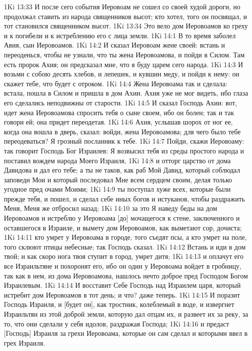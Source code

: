 1Ki 13:33  И после сего события Иеровоам не сошел со своей худой дороги, но продолжал ставить из народа священников высот; кто хотел, того он посвящал, и тот становился священником высот.
1Ki 13:34  Это вело дом Иеровоамов ко греху и к погибели и к истреблению его с лица земли.
1Ki 14:1  В то время заболел Авия, сын Иеровоамов.
1Ki 14:2  И сказал Иеровоам жене своей: встань и переоденься, чтобы не узнали, что ты жена Иеровоамова, и пойди в Силом. Там есть пророк Ахия; он предсказал мне, что я буду царем сего народа.
1Ki 14:3  И возьми с собою десять хлебов, и лепешек, и кувшин меду, и пойди к нему: он скажет тебе, что будет с отроком.
1Ki 14:4  Жена Иеровоама так и сделала: встала, пошла в Силом и пришла в дом Ахии. Ахия уже не мог видеть, ибо глаза его сделались неподвижны от старости.
1Ki 14:5  И сказал Господь Ахии: вот, идет жена Иеровоамова спросить тебя о сыне своем, ибо он болен; так и так говори ей; она придет переодетая.
1Ki 14:6  Ахия, услышав шорох от ног ее, когда она вошла в дверь, сказал: войди, жена Иеровоамова; для чего было тебе переодеваться? Я грозный посланник к тебе.
1Ki 14:7  Пойди, скажи Иеровоаму: так говорит Господь Бог Израилев: Я возвысил тебя из среды простого народа и поставил вождем народа Моего Израиля,
1Ki 14:8  и отторг царство от дома Давидова и дал его тебе; а ты не таков, как раб Мой Давид, который соблюдал заповеди Мои и который последовал Мне всем сердцем своим, делая только угодное пред очами Моими;
1Ki 14:9  ты поступал хуже всех, которые были прежде тебя, и пошел, и сделал себе иных богов и истуканов, чтобы раздражить Меня, Меня же отбросил назад;
1Ki 14:10  за это Я наведу беды на дом Иеровоамов и истреблю у Иеровоама [до] мочащегося к стене, заключенного и оставшегося в Израиле, и вымету дом Иеровоамов, как выметают сор, дочиста;
1Ki 14:11  кто умрет у Иеровоама в городе, того съедят псы, а кто умрет на поле, того склюют птицы небесные; так Господь сказал.
1Ki 14:12  Встань и иди в дом твой; и как скоро нога твоя ступит в город, умрет дитя;
1Ki 14:13  и оплачут его все Израильтяне и похоронят его, ибо он один у Иеровоама войдет в гробницу, так как в нем, из дома Иеровоамова, нашлось нечто доброе пред Господом Богом Израилевым.
1Ki 14:14  И восставит Себе Господь над Израилем царя, который истребит дом Иеровоамов в тот день; и что? даже теперь.
1Ki 14:15  И поразит Господь Израиля, и [будет он], как тростник, колеблемый в воде, и извергнет Израильтян из этой доброй земли, которую дал отцам их, и развеет их за реку, за то, что они сделали у себя идолов, раздражая Господа;
1Ki 14:16  и предаст [Господь] Израиля за грехи Иеровоама, которые он сам сделал и которыми ввел в грех Израиля.
